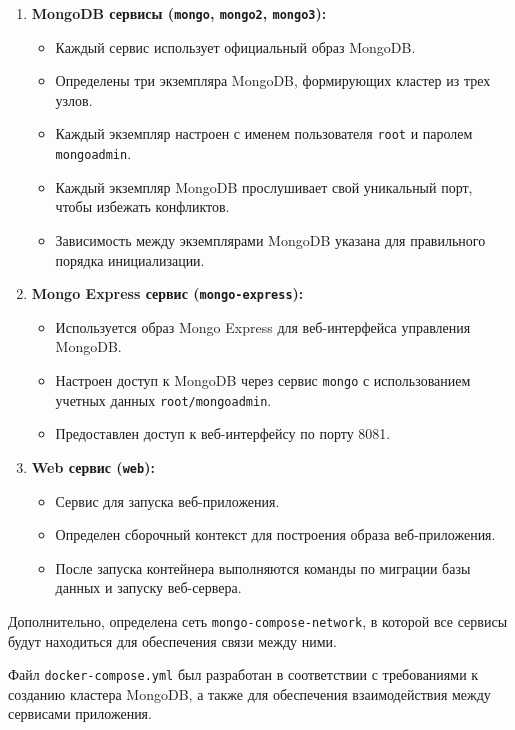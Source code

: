 \begin{enumerate}
    \item \textbf{MongoDB сервисы
		(\texttt{mongo}, \texttt{mongo2}, \texttt{mongo3}):}
    \begin{itemize}
        \item Каждый сервис использует официальный образ MongoDB.
        \item Определены три экземпляра MongoDB,
			формирующих кластер из трех узлов.
        \item Каждый экземпляр настроен с именем пользователя \texttt{root}
			и паролем \texttt{mongoadmin}.
        \item Каждый экземпляр MongoDB прослушивает свой уникальный порт,
			чтобы избежать конфликтов.
        \item Зависимость между экземплярами MongoDB указана
			для правильного порядка инициализации.
    \end{itemize}
    
    \item \textbf{Mongo Express сервис (\texttt{mongo-express}):}
    \begin{itemize}
        \item Используется образ Mongo Express
			для веб-интерфейса управления MongoDB.
        \item Настроен доступ к MongoDB через сервис \texttt{mongo}
			с использованием учетных данных \texttt{root/mongoadmin}.
        \item Предоставлен доступ к веб-интерфейсу по порту 8081.
    \end{itemize}
    
    \item \textbf{Web сервис (\texttt{web}):}
    \begin{itemize}
        \item Сервис для запуска веб-приложения.
        \item Определен сборочный контекст
			для построения образа веб-приложения.
        \item После запуска контейнера выполняются команды
			по миграции базы данных и запуску веб-сервера.
    \end{itemize}
\end{enumerate}

Дополнительно, определена сеть \texttt{mongo-compose-network},
в которой все сервисы будут находиться для обеспечения связи между ними.\par
Файл \texttt{docker-compose.yml} был разработан в соответствии
с требованиями к созданию кластера MongoDB,
а также для обеспечения взаимодействия между сервисами приложения.

